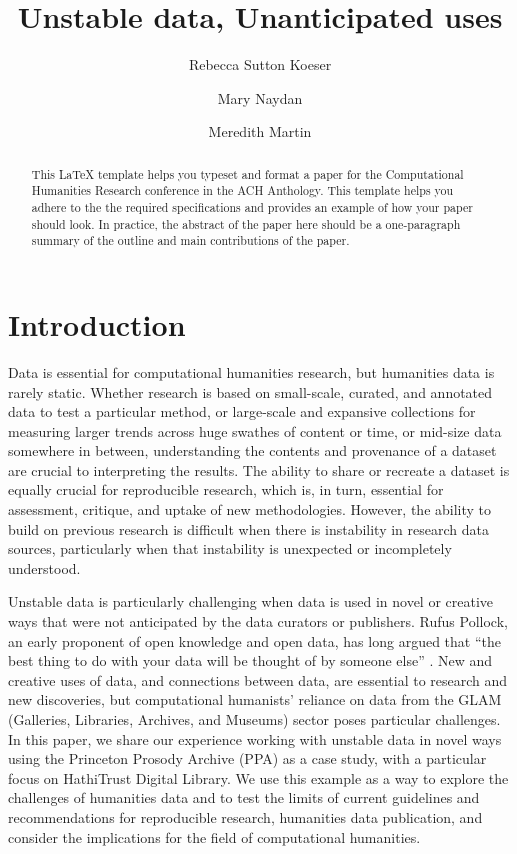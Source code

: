 \documentclass{anthology-ch}         %
\title{Unstable data, Unanticipated uses}
\author[1]{Rebecca Sutton Koeser}[
  orcid=0000-0002-8762-8057
]
\author[1]{Mary Naydan}[
  orcid=0000-0002-7960-3175
]
\author[1,2]{Meredith Martin}[
  orcid=0000-0003-0214-8757
]
\affiliation{1}{Center for Digital Humanities, Princeton University, Princeton, New Jersey, USA}
\begin{document}
\maketitle

\begin{abstract}
This LaTeX template helps you typeset and format a paper for the Computational Humanities Research conference in the ACH Anthology. This template helps you adhere to the the required specifications and provides an example of how your paper should look. In practice, the abstract of the paper here should be a one-paragraph summary of the outline and main contributions of the paper.  
\end{abstract}

\section{Introduction} 

Data is essential for computational humanities research, but humanities data is rarely static. Whether research is based on small-scale, curated, and annotated data to test a particular method, or large-scale and expansive collections for measuring larger trends across huge swathes of content or time, or mid-size data somewhere in between, understanding the contents and provenance of a dataset are crucial to interpreting the results. The ability to share or recreate a dataset is equally crucial for reproducible research, which is, in turn, essential for assessment, critique, and uptake of new methodologies. However, the ability to build on previous research is difficult when there is instability in research data sources,  particularly when that instability is unexpected or incompletely understood. 

Unstable data is particularly challenging when data is used in novel or creative ways that were not anticipated by the data curators or publishers. Rufus Pollock, an early proponent of open knowledge and open data, has long argued that “the best thing to do with your data will be thought of by someone else”  \cite{pollock_open_2011}. New and creative uses of data, and connections between data, are essential to research and new discoveries, but computational humanists’ reliance on data from the GLAM (Galleries, Libraries, Archives, and Museums) sector poses particular challenges. In this paper, we share our experience working with unstable data in novel ways using the Princeton Prosody Archive (PPA) as a case study, with a particular focus on HathiTrust Digital Library. We use this example as a way to explore the challenges of humanities data and to test the limits of current guidelines and recommendations for reproducible research, humanities data publication, and consider the implications for the field of computational humanities. 
\end{document}
